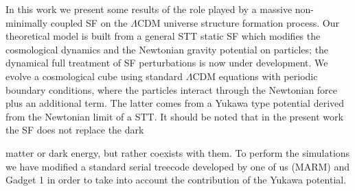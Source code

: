 \documentclass{article}
\begin{document}
In this work we present some results of the role played
by a massive non-minimally coupled SF on the $\Lambda$CDM
universe structure formation process. Our theoretical
model is built from a general STT static SF which modifies
the cosmological dynamics and the Newtonian gravity
potential on particles; the dynamical full treatment of
SF perturbations is now under development. We evolve a
cosmological cube using standard $\Lambda$CDM equations with
periodic boundary conditions, where the particles interact
through the Newtonian force plus an additional term.
The latter comes from a Yukawa type potential derived
from the Newtonian limit of a STT. It should be noted
that in the present work the SF does not replace the dark

matter or dark energy, but rather coexists with them. To
perform the simulations we have modified a standard serial
treecode developed by one of us (MARM) \cite{9_Gabbasov2006} and
Gadget 1 \cite{10_Springel2001} in order to take into account the contribution
of the Yukawa potential.
\end{document}
